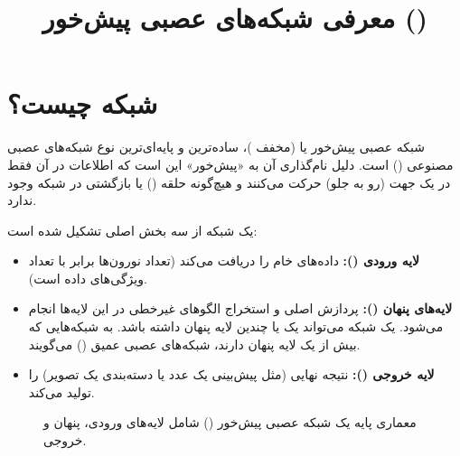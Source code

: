 \documentclass[12pt,a4paper]{article}
\title{معرفی شبکه‌های عصبی پیش‌خور (\lr{FFN})}
\author{}
\date{}
\begin{document}
\maketitle

\section{شبکه  چیست؟}

شبکه عصبی پیش‌خور یا  (مخفف )، ساده‌ترین و پایه‌ای‌ترین نوع شبکه‌های عصبی مصنوعی () است. دلیل نام‌گذاری آن به «پیش‌خور» این است که اطلاعات در آن فقط در یک جهت (رو به جلو) حرکت می‌کنند و هیچ‌گونه حلقه () یا بازگشتی در شبکه وجود ندارد.

یک شبکه  از سه بخش اصلی تشکیل شده است:

\begin{itemize}
    \item \textbf{لایه ورودی ():} داده‌های خام را دریافت می‌کند (تعداد نورون‌ها برابر با تعداد ویژگی‌های داده است).
    \item \textbf{لایه‌های پنهان ():} پردازش اصلی و استخراج الگوهای غیرخطی در این لایه‌ها انجام می‌شود. یک شبکه می‌تواند یک یا چندین لایه پنهان داشته باشد. به شبکه‌هایی که بیش از یک لایه پنهان دارند، شبکه‌های عصبی عمیق () می‌گویند.
    \item \textbf{لایه خروجی ():} نتیجه نهایی (مثل پیش‌بینی یک عدد یا دسته‌بندی یک تصویر) را تولید می‌کند.
\end{itemize}

\begin{figure}[H]
    \centering
    \caption{معماری پایه یک شبکه عصبی پیش‌خور () شامل لایه‌های ورودی، پنهان و خروجی.}
    \label{fig:ffn}
\end{figure}
\end{document}
